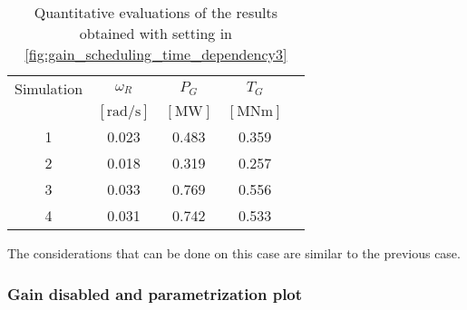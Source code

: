 \begin{table}[htb]
  \caption{Quantitative evaluations of the results obtained with setting in \autoref{fig:gain_scheduling_time_dependency3}}
  \centering
  \begin{tabular}{ccccc}
  \toprule
    Simulation & $\omega_R$  & $P_G$ & $T_G$ \\ 
     & $\left[\si{\radian\per\second}\right]$ & $\left[\si{\mega\watt}\right]$ &$\left[\si{\mega\newton\meter}\right]$ \\ \midrule       
     1 & 0.023 & 0.483 & 0.359 \\
     2 & 0.018 & 0.319 & 0.257 \\
     3 & 0.033 & 0.769 & 0.556 \\
     4 & 0.031 & 0.742 & 0.533 \\
     \bottomrule
  \end{tabular}
  \label{tab:res_variable_gains3}
\end{table}

The considerations that can be done on this case are similar to the previous case. 

\subsubsection{Gain disabled and parametrization plot}

